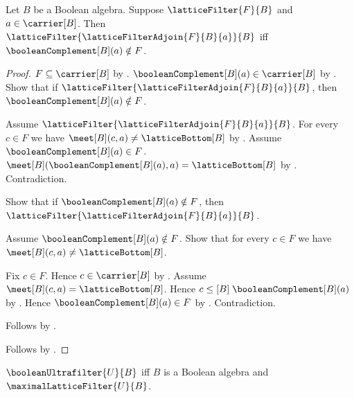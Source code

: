 \begin{theorem}\label{boolean_lattice_filter_adjoin_is_filter_iff}
    Let $B$ be a Boolean algebra.
    Suppose $\latticeFilter{F}{B}$ and $a\in\carrier[B]$.
    Then $\latticeFilter{\latticeFilterAdjoin{F}{B}{a}}{B}$ iff
        $\booleanComplement[B](a)\notin F$.
\end{theorem}
\begin{proof}
    $F\subseteq\carrier[B]$ by
        .
    $\booleanComplement[B](a)\in\carrier[B]$ by
        .
    Show that if
        $\latticeFilter{\latticeFilterAdjoin{F}{B}{a}}{B}$, then
        $\booleanComplement[B](a)\notin F$.
    \begin{subproof}
        Assume $\latticeFilter{\latticeFilterAdjoin{F}{B}{a}}{B}$.
        For every $c\in F$ we have
            $\meet[B](c,a)\neq\latticeBottom[B]$ by
            .
        Assume $\booleanComplement[B](a)\in F$.
        $\meet[B](\booleanComplement[B](a),a)
            =\latticeBottom[B]$ by
            .
        Contradiction.
    \end{subproof}
    Show that if $\booleanComplement[B](a)\notin F$, then
        $\latticeFilter{\latticeFilterAdjoin{F}{B}{a}}{B}$.
    \begin{subproof}
        Assume $\booleanComplement[B](a)\notin F$.
        Show that for every $c\in F$ we have
            $\meet[B](c,a)\neq\latticeBottom[B]$.
        \begin{subproof}
            Fix $c\in F$.
            Hence $c\in\carrier[B]$ by .
            Assume $\meet[B](c,a)=\latticeBottom[B]$.
            Hence $c\mathrel{\leq[B]}\booleanComplement[B](a)$ by
                .
            Hence $\booleanComplement[B](a)\in F$ by
                .
            Contradiction.
        \end{subproof}
        Follows by .
    \end{subproof}
    Follows by \auto.
\end{proof}

\begin{definition}\label{boolean_ultrafilter}
    $\booleanUltrafilter{U}{B}$ iff
        $B$ is a Boolean algebra and $\maximalLatticeFilter{U}{B}$.
\end{definition}

